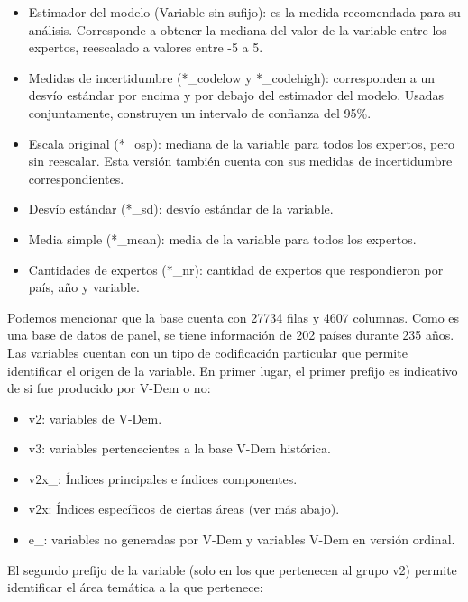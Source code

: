 \documentclass{article}
\begin{document}
\begin{itemize}
 \item Estimador del modelo (Variable sin sufijo): es la medida
  recomendada para su análisis. Corresponde a obtener la mediana del valor de 
  la variable entre los expertos, reescalado a valores entre -5 a 5.
 \item Medidas de incertidumbre (*\_codelow y *\_codehigh): corresponden a un 
 desvío estándar por encima y por debajo del estimador del modelo. 
 Usadas conjuntamente, construyen un intervalo de confianza del 95\%.
 \item Escala original (*\_osp): mediana de la variable para todos los expertos, pero sin 
 reescalar. Esta versión también cuenta con sus medidas de incertidumbre correspondientes.
 \item Desvío estándar (*\_sd): desvío estándar de la variable.
 \item Media simple (*\_mean): media de la variable para todos los expertos.
 \item Cantidades de expertos (*\_nr): cantidad de expertos que respondieron por
 país, año y variable.
\end{itemize}

Podemos mencionar que la base cuenta con 27734 filas y 4607 columnas. Como es una 
base de datos de panel, se tiene información de 202 países durante 235 años. Las 
variables cuentan con un tipo de codificación particular que permite identificar el 
origen de la variable. En primer lugar, el primer prefijo es indicativo de si fue 
producido por V-Dem o no:

\begin{itemize}
 \item v2: variables de V-Dem.
 \item v3: variables pertenecientes a la base V-Dem histórica.
 \item v2x\_: Índices principales e índices componentes.
 \item v2x: Índices específicos de ciertas 
 áreas (ver más abajo).
 \item e\_: variables no generadas por V-Dem y variables V-Dem en versión ordinal.
\end{itemize}

El segundo prefijo de la variable (solo en los que pertenecen al grupo v2) permite 
identificar el área temática a la que pertenece:
\end{document}
